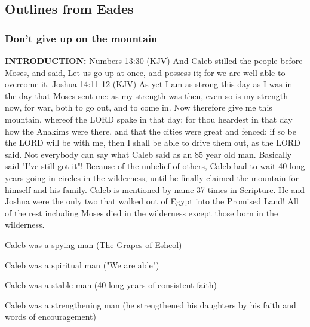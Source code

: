 \subsection{Outlines from Eades}

\subsubsection{Don't give up on the mountain}

\textbf{INTRODUCTION: } Numbers 13:30 (KJV)  And Caleb stilled the people before Moses, and said, Let us go up at once, and possess it; for we are well able to overcome it.
Joshua 14:11-12 (KJV)  As yet I am as strong this day as I was in the day that Moses sent me: as my strength was then, even so is my strength now, for war, both to go out, and to come in.
Now therefore give me this mountain, whereof the LORD spake in that day; for thou heardest in that day how the Anakims were there, and that the cities were great and fenced: if so be the LORD will be with me, then I shall be able to drive them out, as the LORD said.
Not everybody can say what Caleb said as an 85 year old man. Basically said "I've still got it"!  Because of the unbelief of others, Caleb had to wait 40 long years going in circles in the wilderness, until he finally claimed the mountain for himself and his family.
Caleb is mentioned by name 37 times in Scripture. He and Joshua were the only two that walked out of Egypt into the Promised Land! All of the rest including Moses died in the wilderness except those born in the wilderness.
\begin{compactenum}[I.][19]
    \item Caleb was a spying man
(The Grapes of Eshcol)
    \item Caleb was a spiritual man
("We are able")
    \item Caleb was a stable man
(40 long years of consistent faith)
    \item Caleb was a strengthening man (he strengthened his daughters by his faith and words of encouragement)
\end{compactenum}


